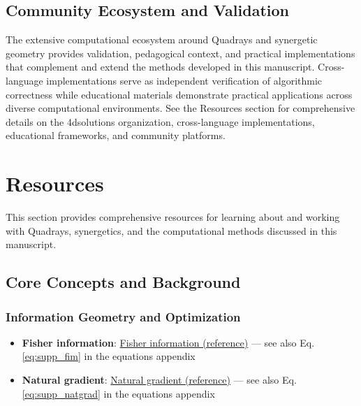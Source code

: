 \documentclass[
  10pt,
]{article}
\providecommand{\tightlist}{%
  \setlength{\itemsep}{0pt}\setlength{\parskip}{0pt}}
\begin{document}
\hypertarget{community-ecosystem-and-validation}{%
\subsection{Community Ecosystem and
Validation}\label{community-ecosystem-and-validation}}

The extensive computational ecosystem around Quadrays and synergetic
geometry provides validation, pedagogical context, and practical
implementations that complement and extend the methods developed in this
manuscript. Cross-language implementations serve as independent
verification of algorithmic correctness while educational materials
demonstrate practical applications across diverse computational
environments. See the Resources section for comprehensive details on the
4dsolutions organization, cross-language implementations, educational
frameworks, and community platforms.

\newpage

\hypertarget{resources}{%
\section{Resources}\label{resources}}

This section provides comprehensive resources for learning about and
working with Quadrays, synergetics, and the computational methods
discussed in this manuscript.

\hypertarget{core-concepts-and-background}{%
\subsection{Core Concepts and
Background}\label{core-concepts-and-background}}

\hypertarget{information-geometry-and-optimization}{%
\subsubsection{Information Geometry and
Optimization}\label{information-geometry-and-optimization}}

\begin{itemize}
\tightlist
\item
  \textbf{Fisher information}:
  \href{https://en.wikipedia.org/wiki/Fisher_information}{Fisher
  information (reference)} --- see also Eq. \eqref{eq:supp_fim} in the
  equations appendix
\item
  \textbf{Natural gradient}:
  \href{https://en.wikipedia.org/wiki/Natural_gradient}{Natural gradient
  (reference)} --- see also Eq. \eqref{eq:supp_natgrad} in the equations
  appendix
\end{itemize}
\end{document}
